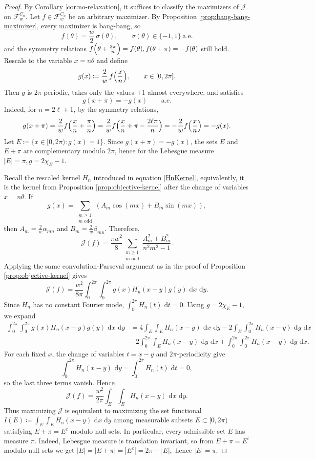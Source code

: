 \documentclass[10pt,a4paper]{amsart}
\newcommand{\dd}{\,\mathrm{d}}
\begin{document}
\begin{proof}
By Corollary \ref{cor:no-relaxation}, it suffices to classify the maximizers of $\mathcal J$ on $\mathcal F_w^{C_n}$. Let $f\in\mathcal F_w^{C_n}$ be an arbitrary maximizer. By Proposition \ref{prop:bang-bang-maximizer}, every maximizer is bang-bang, so
\[
f(\theta)=\frac w2\,\sigma(\theta),\qquad \sigma(\theta)\in\{-1,1\}\ \text{a.e.}
\]
and the symmetry relations
\(
f\Bigl(\theta+\frac{2\pi}{n}\Bigr)=f(\theta),
f(\theta+\pi)=-f(\theta)
\)
still hold.
Rescale to the variable $x=n\theta$ and define
\[
g(x)\coloneqq \frac{2}{w}\,f\Bigl(\frac{x}{n}\Bigr),\qquad x\in[0,2\pi].
\]
Then $g$ is $2\pi$-periodic, takes only the values $\pm1$ almost everywhere, and satisfies
\[
g(x+\pi)=-g(x)\qquad\text{a.e.}
\]
Indeed, for $n=2\ell+1$, by the symmetry relations,
\[
g(x+\pi)=\frac{2}{w}f\Bigl(\frac{x}{n}+\frac{\pi}{n}\Bigr)=\frac{2}{w}f\Bigl(\frac{x}{n}+\pi-\frac{2\ell\pi}{n}\Bigr)=-\frac{2}{w}f\Bigl(\frac{x}{n}\Bigr)=-g(x).
\]
Let
\(
E\coloneqq\{x\in[0,2\pi):g(x)=1\}.
\)
Since $g(x+\pi)=-g(x)$, the sets $E$ and $E+\pi$ are complementary modulo $2\pi$, hence for the Lebesgue measure
\(
|E|=\pi,
g=2\chi_E-1.
\)

Recall the rescaled kernel $H_n$ introduced in equation \eqref{HnKernel}, equivalently, it is the kernel from Proposition \ref{prop:objective-kernel} after the change of variables $x=n\theta$.
If
\[
g(x)=\sum_{\substack{m\ge1\\m\text{ odd}}}(A_m\cos(mx)+B_m\sin(mx)),
\]
then $A_m=\frac{2}{w}\alpha_{mn}$ and $B_m=\frac{2}{w}\beta_{mn}$. Therefore,
\[
\mathcal J(f)=\frac{\pi w^2}{8}\sum_{\substack{m\ge1\\m\text{ odd}}}\frac{A_m^2+B_m^2}{n^2m^2-1}.
\]
Applying the same convolution-Parseval argument as in the proof of Proposition \ref{prop:objective-kernel} gives
\[
\mathcal J(f)=\frac{w^2}{8\pi}\int_0^{2\pi}\int_0^{2\pi} g(x)H_n(x-y)g(y)\,\dd x\,\dd y.
\]
Since $H_n$ has no constant Fourier mode,
\(
\int_0^{2\pi}H_n(t)\,\dd t=0.
\)
Using $g=2\chi_E-1$, we expand
\begin{align*}
\int_0^{2\pi}\!\int_0^{2\pi} g(x)H_n(x-y)g(y)\,\dd x\,\dd y&=
4\int_E\!\int_E H_n(x-y)\,\dd x\,\dd y -2\int_E\!\int_0^{2\pi} H_n(x-y)\,\dd y\,\dd x\\
&-2\int_0^{2\pi}\!\int_E H_n(x-y)\,\dd y\,\dd x  +\int_0^{2\pi}\!\int_0^{2\pi} H_n(x-y)\,\dd y\,\dd x.
\end{align*}
For each fixed $x$, the change of variables $t=x-y$ and $2\pi$-periodicity give
\[
\int_0^{2\pi} H_n(x-y)\,\dd y=\int_0^{2\pi}H_n(t)\,\dd t=0,
\]
so the last three terms vanish. Hence
\[
\mathcal J(f)=\frac{w^2}{2\pi}\int_E\int_E H_n(x-y)\,\dd x\,\dd y.
\]
Thus maximizing $\mathcal J$ is equivalent to maximizing the set functional
\(
I(E)\coloneqq \int_E\int_E H_n(x-y)\,\dd x\,\dd y
\)
among measurable subsets $E\subset[0,2\pi)$ satisfying $E+\pi=E^c$ modulo null sets. In particular, every admissible set $E$ has measure $\pi$.
Indeed, Lebesgue measure is translation invariant, so from $E+\pi=E^c$ modulo null sets we get
\(
|E|=|E+\pi|=|E^c|=2\pi-|E|,
\)
hence $|E|=\pi$.


\end{proof}
\end{document}
